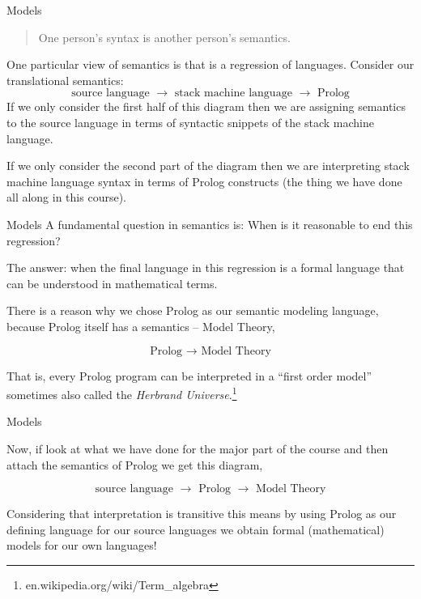 \documentclass{beamer}
\begin{document}
\begin{frame}[fragile]{Models}

\begin{quote}
One person's syntax is another person's semantics.
\end{quote}

One particular view of semantics is that is a regression of languages.  Consider our translational semantics:
\[
\mbox{source language $\rightarrow$ stack machine language $\rightarrow$ Prolog}
\]
If we only consider the first half of this diagram then we are assigning semantics to the source language in terms
of syntactic snippets of the stack machine language.  

\vspace{.1in}

If we only consider the second part of the diagram then
we are interpreting stack machine language syntax in terms of Prolog constructs (the thing we have done all along
in this course).
\end{frame}


\begin{frame}[fragile]{Models}
A fundamental question in semantics is: When is it reasonable to end this regression? 

\vspace{.1in}

The answer: when the final language
in this regression is a formal language that can be understood in mathematical terms.

\vspace{.1in}

There is a reason why we chose Prolog as our semantic modeling language, because Prolog itself has
a semantics -- Model Theory,

\[
\mbox{Prolog $\rightarrow$ Model Theory}
\]

That is, every Prolog program can be interpreted in a ``first order model'' sometimes also called the {\em Herbrand Universe}.\footnote{{en.wikipedia.org/wiki/Term\_algebra}}
\end{frame}

\begin{frame}[fragile]{Models}

Now, if look at what we have done for the major part of the course and then attach the semantics of Prolog we get this diagram,

\[
\mbox{source language $\rightarrow$ Prolog $\rightarrow$ Model Theory}
\]

Considering that interpretation is transitive this means by using Prolog as our defining language for our source languages
we obtain formal (mathematical) models for our own languages!

\end{frame}
\end{document}

